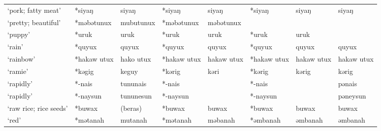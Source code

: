 \begin{landscape}
\begin{longtable}[c]{@{}p{3cm}<{\raggedright}p{2.75cm}<{\raggedright}p{2.75cm}<{\raggedright}p{2.75cm}<{\raggedright}p{2.75cm}<{\raggedright}p{2.75cm}<{\raggedright}p{2.75cm}<{\raggedright}p{2.75cm}<{\raggedright}@{}}
`pork; fatty meat'                                   & *siyaŋ             & siyaŋ                          & *siyaŋ             & siyaŋ                      & *siyaŋ           & siyaŋ                    & siyaŋ                             \\
`pretty; beautiful'                                  & *məbətunux         & mubutunux                      & *məbətunux         & məbətunux                  &                  &                          &                                   \\
`puppy'                                              & *uruk              & uruk                           & *uruk              & uruk                       & *uruk            & uruk                     &                                   \\
`rain'                                               & *quyux             & quyux                          & *quyux             & quyux                      & *quyux           & quyux                    & quyux                             \\
`rainbow'                                            & *hakaw utux        & hako utux                      & *hakaw utux        & hakaw utux                 & *hakaw utux      & hakaw utux               & hakaw utux                        \\
`ramie'                                              & *kəgig             & keguy                          & *kərig             & kəri                       & *kərig           & kərig                    & kərig                             \\
`rapidly'                                            & *-nais             & tununais                       & *-nais             &                            & *-nais           &                          & pənais                            \\
`rapidly'                                            & *-naysun           & tununesun                      & *-naysun           &                            & *-naysun         &                          & pəneysun                          \\
`raw rice; rice seeds'                               & *buwax             & (beras)                        & *buwax             & buwax                      & *buwax           & buwax                    & buwax                             \\
`red'                                                & *mətanah           & mutanah                        & *mətanah           & məbanah                    & *əmbanah         & əmbanah                  & əmbanah                           \\

\end{longtable}
\end{landscape}
